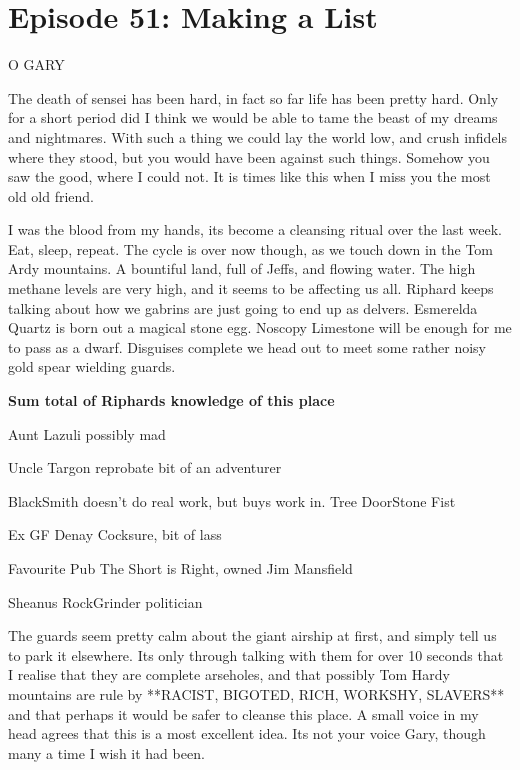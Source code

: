 \section{Episode 51: Making a List}

\begin{multicols}{2}

O GARY\medskip

The death of sensei has been hard, in fact so far life has been pretty hard. Only for a short period did I think we would be able to tame the beast of my dreams and nightmares. With such a thing we could lay the world low, and crush infidels where they stood, but you would have been against such things. Somehow you saw the good, where I could not. It is times like this when I miss you the most old old friend.\medskip

I was the blood from my hands, its become a cleansing ritual over the last week. Eat, sleep, repeat. The cycle is over now though, as we touch down in the Tom Ardy mountains. A bountiful land, full of Jeffs, and flowing water. The high methane levels are very high, and it seems to be affecting us all. Riphard keeps talking about how we gabrins are just going to end up as delvers. Esmerelda Quartz is born out a magical stone egg. Noscopy Limestone will be enough for me to pass as a dwarf. Disguises complete we head out to meet some rather noisy gold spear wielding guards.\medskip

\textbf{Sum total of Riphards knowledge of this place} \medskip

    Aunt Lazuli possibly mad

    Uncle Targon reprobate bit of an adventurer

    BlackSmith doesn't do real work, but buys work in. Tree DoorStone Fist

    Ex GF Denay Cocksure, bit of lass

    Favourite Pub The Short is Right, owned Jim Mansfield

    Sheanus RockGrinder politician\medskip

The guards seem pretty calm about the giant airship at first, and simply tell us to park it elsewhere. Its only through talking with them for over 10 seconds that I realise that they are complete arseholes, and that possibly Tom Hardy mountains are rule by **RACIST, BIGOTED, RICH, WORKSHY, SLAVERS** and that perhaps it would be safer to cleanse this place. A small voice in my head agrees that this is a most excellent idea. Its not your voice Gary, though many a time I wish it had been.\medskip


\end{multicols}
